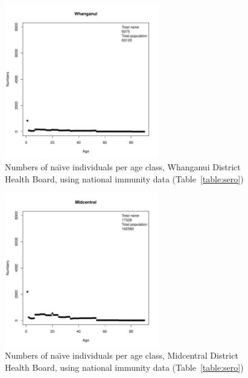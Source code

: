 \documentclass{article}
\begin{document}
\begin{itemize}
\begin{figure}[H]
     \begin{center}
     \includegraphics[width=0.6\textwidth]{dhb11.pdf}
     \end{center}
     \caption{Numbers of na\"{\i}ve individuals per age class, Whanganui District Health Board, using national immunity data (Table~\ref{table:sero})}
     \label{fig:Whanganui}
\end{figure}

\begin{figure}[H]
     \begin{center}
     \includegraphics[width=0.6\textwidth]{dhb12.pdf}
     \end{center}
     \caption{Numbers of na\"{\i}ve individuals per age class, Midcentral District Health Board, using national immunity data (Table~\ref{table:sero})}
     \label{fig:Midcentral}
\end{figure}


\end{itemize}
\end{document}
